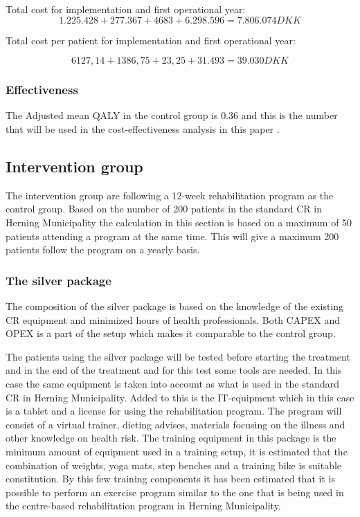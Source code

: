 Total cost for implementation and first operational year:
$$1.225.428 + 277.367 + 4683 + 6.298.596 = 7.806.074DKK$$

Total cost per patient for implementation and first operational year:

$$6127,14+1386,75+23,25+31.493= 39.030DKK$$


\subsubsection{Effectiveness}

 The Adjusted mean QALY in the control group is 0.36 and this is the number that will be used in the cost-effectiveness analysis in this paper \cite{costeffect}. 

\subsection{Intervention group}

The intervention group are following a 12-week rehabilitation program as the control group. Based on the number of 200 patients in the standard CR in Herning Municipality the calculation in this section is based on a maximum of 50 patients attending a program at the same time. This will give a maximum 200 patients follow the program on a yearly basis. 

\subsubsection{The silver package}

The composition of the silver package is based on the knowledge of the existing CR equipment and minimized hours of health professionals. Both CAPEX and OPEX is a part of the setup which makes it comparable to the control group. 

The patients using the silver package will be tested before starting the treatment and in the end of the treatment and for this test some tools are needed. In this case the same equipment is taken into account as what is used in the standard CR in Herning Municipality. Added to this is the IT-equipment which in this case is a tablet and a license for using the rehabilitation program. The program will consist of a virtual trainer, dieting advises, materials focusing on the illness and other knowledge on health risk. The training equipment in this package is the minimum amount of equipment used in a training setup, it is estimated that the combination of weights, yoga mats, step benches and a training bike is suitable constitution. By this few training components it has been estimated that it is possible to perform an exercise program similar to the one that is being used in the centre-based rehabilitation program in Herning Municipality. 

